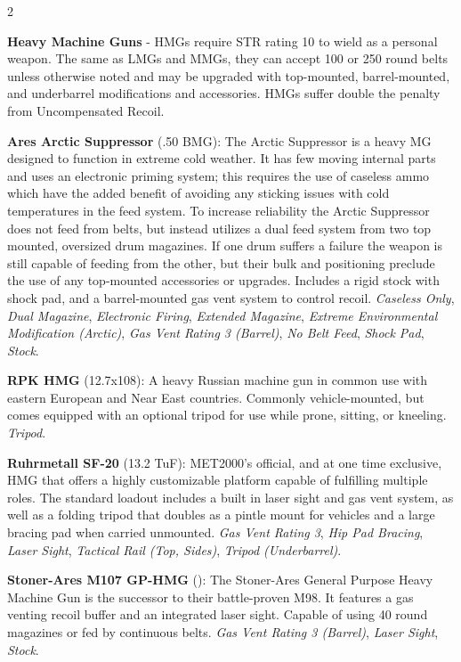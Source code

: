 \documentclass[
  oneside]{article}
\begin{document}
\begin{multicols}{2}

\textbf{Heavy Machine Guns} - HMGs require STR
rating 10 to wield as a personal weapon. The same
as LMGs and MMGs, they can accept 100 or 250 round
belts unless otherwise noted and may be upgraded
with top-mounted, barrel-mounted, and underbarrel
modifications and accessories. HMGs suffer double
the penalty from Uncompensated Recoil.

\textbf{Ares Arctic Suppressor} (.50 BMG): The
Arctic Suppressor is a heavy MG designed to
function in extreme cold weather. It has few
moving internal parts and uses an electronic
priming system; this requires the use of caseless
ammo which have the added benefit of avoiding any
sticking issues with cold temperatures in the feed
system. To increase reliability the Arctic
Suppressor does not feed from belts, but instead
utilizes a dual feed system from two top mounted,
oversized drum magazines. If one drum suffers a
failure the weapon is still capable of feeding
from the other, but their bulk and positioning
preclude the use of any top-mounted accessories or
upgrades. Includes a rigid stock with shock pad,
and a barrel-mounted gas vent system to control
recoil. \emph{Caseless Only}, \emph{Dual
Magazine}, \emph{Electronic Firing},
\emph{Extended Magazine}, \emph{Extreme
Environmental Modification (Arctic)}, \emph{Gas
Vent Rating 3 (Barrel)}, \emph{No Belt Feed},
\emph{Shock Pad}, \emph{Stock}.

\textbf{RPK HMG} (12.7x108): A heavy Russian
machine gun in common use with eastern European
and Near East countries. Commonly vehicle-mounted,
but comes equipped with an optional tripod for use
while prone, sitting, or kneeling. \emph{Tripod}.

\textbf{Ruhrmetall SF-20} (13.2 TuF): MET2000's
official, and at one time exclusive, HMG that
offers a highly customizable platform capable of
fulfilling multiple roles. The standard loadout
includes a built in laser sight and gas vent
system, as well as a folding tripod that doubles
as a pintle mount for vehicles and a large bracing
pad when carried unmounted. \emph{Gas Vent Rating
3}, \emph{Hip Pad Bracing}, \emph{Laser Sight},
\emph{Tactical Rail (Top, Sides)}, \emph{Tripod
(Underbarrel)}.

\textbf{Stoner-Ares M107 GP-HMG} (): The
Stoner-Ares General Purpose Heavy Machine Gun is
the successor to their battle-proven M98. It
features a gas venting recoil buffer and an
integrated laser sight. Capable of using 40 round
magazines or fed by continuous belts. \emph{Gas
Vent Rating 3 (Barrel)}, \emph{Laser Sight},
\emph{Stock}.


\end{multicols}
\end{document}
